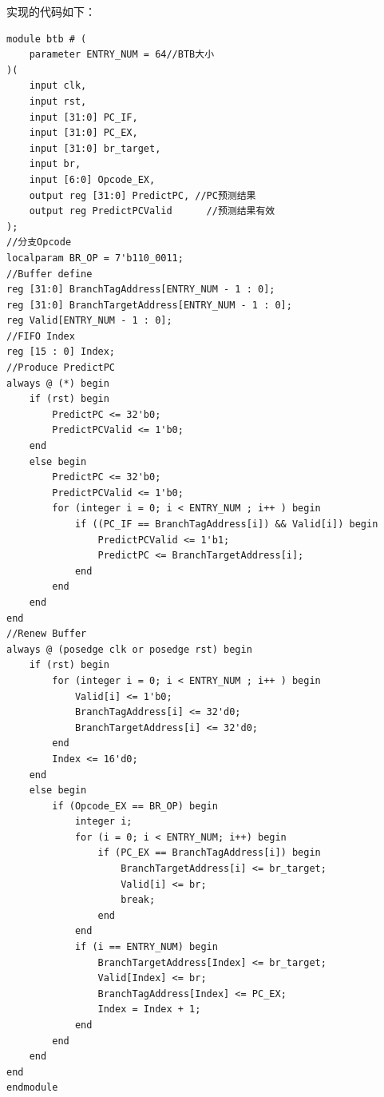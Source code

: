 \documentclass{ctexart}
\begin{document}
\par 实现的代码如下：
\begin{lstlisting}
module btb # (
    parameter ENTRY_NUM = 64//BTB大小
)(
    input clk, 
    input rst, 
    input [31:0] PC_IF, 
    input [31:0] PC_EX, 
    input [31:0] br_target, 
    input br, 
    input [6:0] Opcode_EX, 
    output reg [31:0] PredictPC, //PC预测结果
    output reg PredictPCValid      //预测结果有效
);
//分支Opcode
localparam BR_OP = 7'b110_0011; 
//Buffer define
reg [31:0] BranchTagAddress[ENTRY_NUM - 1 : 0]; 
reg [31:0] BranchTargetAddress[ENTRY_NUM - 1 : 0]; 
reg Valid[ENTRY_NUM - 1 : 0]; 
//FIFO Index
reg [15 : 0] Index; 
//Produce PredictPC
always @ (*) begin
    if (rst) begin
        PredictPC <= 32'b0; 
        PredictPCValid <= 1'b0; 
    end
    else begin
        PredictPC <= 32'b0; 
        PredictPCValid <= 1'b0; 
        for (integer i = 0; i < ENTRY_NUM ; i++ ) begin
            if ((PC_IF == BranchTagAddress[i]) && Valid[i]) begin
                PredictPCValid <= 1'b1; 
                PredictPC <= BranchTargetAddress[i]; 
            end
        end
    end
end 
//Renew Buffer
always @ (posedge clk or posedge rst) begin
    if (rst) begin
        for (integer i = 0; i < ENTRY_NUM ; i++ ) begin
            Valid[i] <= 1'b0; 
            BranchTagAddress[i] <= 32'd0; 
            BranchTargetAddress[i] <= 32'd0; 
        end
        Index <= 16'd0; 
    end
    else begin
        if (Opcode_EX == BR_OP) begin
            integer i; 
            for (i = 0; i < ENTRY_NUM; i++) begin
                if (PC_EX == BranchTagAddress[i]) begin
                    BranchTargetAddress[i] <= br_target; 
                    Valid[i] <= br; 
                    break; 
                end
            end
            if (i == ENTRY_NUM) begin
                BranchTargetAddress[Index] <= br_target; 
                Valid[Index] <= br; 
                BranchTagAddress[Index] <= PC_EX; 
                Index = Index + 1; 
            end
        end
    end
end
endmodule
\end{lstlisting}
\end{document}
